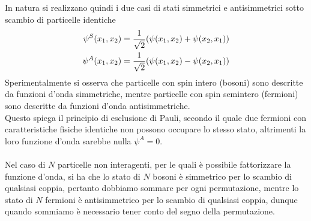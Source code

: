 \documentclass{article}
\begin{document}
In natura si realizzano quindi i due casi di stati simmetrici e antisimmetrici sotto scambio di particelle identiche
\begin{align}
    \psi^S(x_1, x_2) = \frac{1}{\sqrt{2}}(\psi(x_1, x_2) + \psi(x_2, x_1)) \notag \\
    \psi^A(x_1, x_2) = \frac{1}{\sqrt{2}}(\psi(x_1, x_2) - \psi(x_2, x_1)) \notag
\end{align}
Sperimentalmente si osserva che particelle con spin intero (bosoni) sono descritte da funzioni d'onda simmetriche, mentre particelle con spin semintero (fermioni) sono descritte da funzioni d'onda antisimmetriche. \\
Questo spiega il principio di esclusione di Pauli, secondo il quale due fermioni con caratteristiche fisiche identiche non possono occupare lo stesso stato, altrimenti la loro funzione d'onda sarebbe nulla $\psi^A = 0$. \\ \\
Nel caso di $N$ particelle non interagenti, per le quali è possibile fattorizzare la funzione d'onda, si ha che lo stato di $N$ bosoni è simmetrico per lo scambio di qualsiasi coppia, pertanto dobbiamo sommare per ogni permutazione, mentre lo stato di $N$ fermioni è antisimmetrico per lo scambio di qualsiasi coppia, dunque quando sommiamo è necessario tener conto del segno della permutazione.

\newpage
\end{document}
